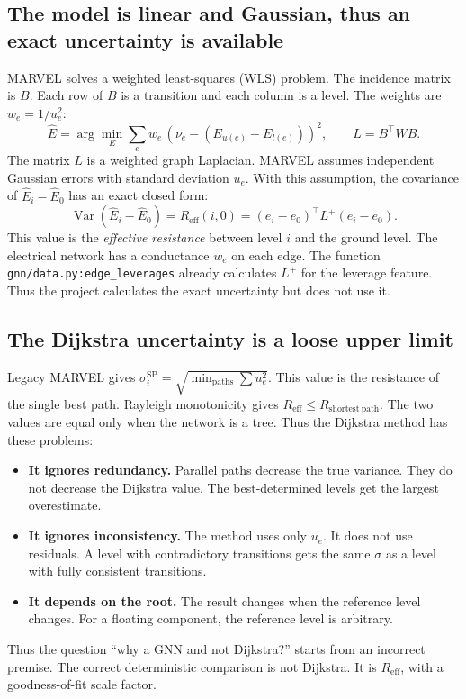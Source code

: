 \documentclass[11pt,a4paper]{article}
\newcommand{\code}[1]{\texttt{#1}}
\begin{document}
\subsection{The model is linear and Gaussian, thus an exact uncertainty is available}
MARVEL solves a weighted least-squares (WLS) problem. The incidence matrix is $B$.
Each row of $B$ is a transition and each column is a level. The weights are
$w_e = 1/u_e^2$:
\[
\hat E = \arg\min_E \sum_e w_e\,(\nu_e - (E_{u(e)} - E_{l(e)}))^2,
\qquad L = B^\top W B .
\]
The matrix $L$ is a weighted graph Laplacian. MARVEL assumes independent Gaussian
errors with standard deviation $u_e$. With this assumption, the covariance of
$\hat E_i - \hat E_0$ has an exact closed form:
\[
\operatorname{Var}(\hat E_i - \hat E_0) = R_{\mathrm{eff}}(i,0)
  = (e_i - e_0)^\top L^{+} (e_i - e_0).
\]
This value is the \emph{effective resistance} between level $i$ and the ground level.
The electrical network has a conductance $w_e$ on each edge. The function
\code{gnn/data.py:edge\_leverages} already calculates $L^{+}$ for the leverage
feature. Thus the project calculates the exact uncertainty but does not use it.

\subsection{The Dijkstra uncertainty is a loose upper limit}
Legacy MARVEL gives $\sigma_i^{\mathrm{SP}} = \sqrt{\min_{\text{paths}} \sum u_e^2}$.
This value is the resistance of the single best path. Rayleigh monotonicity gives
$R_{\mathrm{eff}} \le R_{\mathrm{shortest\ path}}$. The two values are equal only
when the network is a tree. Thus the Dijkstra method has these problems:
\begin{itemize}
\item \textbf{It ignores redundancy.} Parallel paths decrease the true variance. They
  do not decrease the Dijkstra value. The best-determined levels get the largest
  overestimate.
\item \textbf{It ignores inconsistency.} The method uses only $u_e$. It does not use
  residuals. A level with contradictory transitions gets the same $\sigma$ as a level
  with fully consistent transitions.
\item \textbf{It depends on the root.} The result changes when the reference level
  changes. For a floating component, the reference level is arbitrary.
\end{itemize}
Thus the question ``why a GNN and not Dijkstra?'' starts from an incorrect premise.
The correct deterministic comparison is not Dijkstra. It is $R_{\mathrm{eff}}$, with
a goodness-of-fit scale factor.
\end{document}
